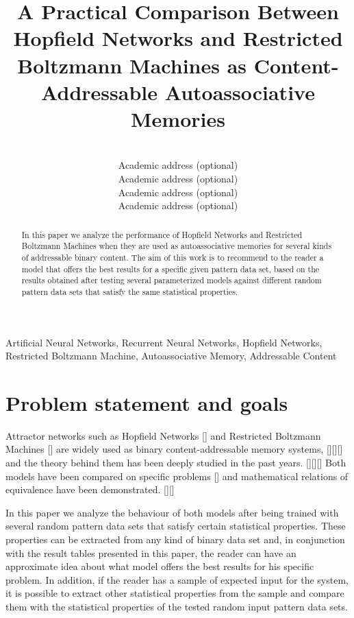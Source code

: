 \documentclass[anon]{CI}
\title[My CI Project]{A Practical Comparison Between Hopfield Networks and Restricted Boltzmann Machines as Content-Addressable Autoassociative Memories}
\author{
 \Name{Javier Beltr{\'a}n} \Email{javierbeltranj@gmail.com}\\
 \addr Academic address (optional)
 \AND
 \Name{Guillermo Bern{\'e}rdez} \Email{gbg1441@gmail.com}\\
 \addr Academic address (optional)
 \AND
 \Name{Juan Lao} \Email{nitzing@gmail.com}\\
 \addr Academic address (optional)
 \AND
 \Name{Jorge Rodr{\'i}guez} \Email{j.rodriguez.molinuevo@gmail.com}\\
 \addr Academic address (optional)
 }
\begin{document}
\maketitle

\begin{abstract}
In this paper we analyze the performance of Hopfield Networks and Restricted Boltzmann Machines when they are used as autoassociative memories for several kinds of addressable binary content. The aim of this work is to recommend to the reader a model that offers the best results for a specific given pattern data set, based on the results obtained after testing several parameterized models against different random pattern data sets that satisfy the same statistical properties. 
\end{abstract}

\begin{keywords}
 Artificial Neural Networks, Recurrent Neural Networks, Hopfield Networks, Restricted Boltzmann Machine, Autoassociative Memory, Addressable Content
\end{keywords}


\section{Problem statement and goals}

Attractor networks such as Hopfield Networks [\cite{hopfield1982neural}] and Restricted Boltzmann Machines [\cite{Smolensky87}] are widely used as binary content-addressable memory systems, [\cite{DAI1998159}][\cite{SCHULZ1995145}][\cite{KrizhevskyH11}] and the theory behind them has been deeply studied in the past years. [\cite{80232}][\cite{298706}][\cite{6889573}] Both models have been compared on specific problems [\cite{552753}] and mathematical relations of equivalence have been demonstrated. [\cite{Barra20121}][\cite{Agliari201352}]

In this paper we analyze the behaviour of both models after being trained with several random pattern data sets that satisfy certain statistical properties. These properties can be extracted from any kind of binary data set and, in conjunction with the result tables presented in this paper, the reader can have an approximate idea about what model offers the best results for his specific problem. In addition, if the reader has a sample of expected input for the system, it is possible to extract other statistical properties from the sample and compare them with the statistical properties of the tested random input pattern data sets.
\end{document}
